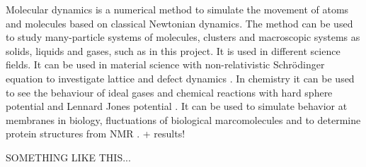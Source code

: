 Molecular dynamics is a numerical method to simulate the movement of atoms and molecules based on classical Newtonian dynamics. The method can be used to study many-particle systems of molecules, clusters and macroscopic systems as solids, liquids and gases, such as in this project. It is used in different science fields. It can be used in material science with non-relativistic Schrödinger equation to investigate lattice and defect dynamics \cite{materialphysics}. In chemistry it can be used to see the behaviour of ideal gases and chemical reactions with hard sphere potential and Lennard Jones potential \cite{GORECKI1989245}. It can be used to simulate behavior at membranes in biology, fluctuations of biological marcomolecules and to determine protein structures from NMR \cite{biology}.
+ results!

SOMETHING LIKE THIS...